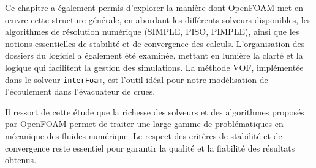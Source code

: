 Ce chapitre a également permis d'explorer la manière dont OpenFOAM met en œuvre cette structure générale, en abordant les différents solveurs disponibles, les algorithmes de résolution numérique (SIMPLE, PISO, PIMPLE), ainsi que les notions essentielles de stabilité et de convergence des calculs. L'organisation des dossiers du logiciel a également été examinée, mettant en lumière la clarté et la logique qui facilitent la gestion des simulations. La méthode VOF, implémentée dans le solveur \texttt{interFoam}, est l'outil idéal pour notre modélisation de l'écoulement dans l'évacuateur de crues.

Il ressort de cette étude que la richesse des solveurs et des algorithmes proposés par OpenFOAM permet de traiter une large gamme de problématiques en mécanique des fluides numérique. Le respect des critères de stabilité et de convergence reste essentiel pour garantir la qualité et la fiabilité des résultats obtenus.
